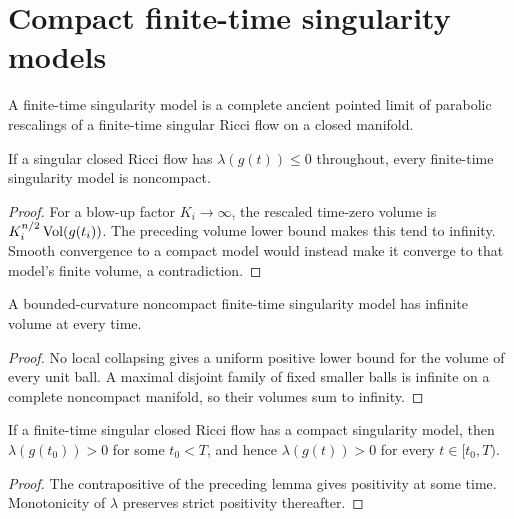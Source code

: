\section{Compact finite-time singularity models}

\begin{remark}
\label{rem:chow-iii-ch17-singularity-models}
A finite-time singularity model is a complete ancient pointed limit of
parabolic rescalings of a finite-time singular Ricci flow on a closed
manifold.
\end{remark}

\begin{lemma}
\label{lem:chow-iii-ch17-model-noncompact-nonpositive-lambda}
If a singular closed Ricci flow has $\lambda(g(t))\le0$ throughout, every
finite-time singularity model is noncompact.
\end{lemma}
\begin{proof}
For a blow-up factor $K_i\to\infty$, the rescaled time-zero volume is
$K_i^{n/2}\operatorname{Vol}(g(t_i))$.  The preceding volume lower bound makes this tend
to infinity.  Smooth convergence to a compact model would instead make it
converge to that model's finite volume, a contradiction.
\end{proof}

\begin{remark}
\label{rem:chow-iii-ch17-noncompact-model-infinite-volume}
A bounded-curvature noncompact finite-time singularity model has infinite
volume at every time.
\end{remark}
\begin{proof}
No local collapsing gives a uniform positive lower bound for the volume of
every unit ball.  A maximal disjoint family of fixed smaller balls is
infinite on a complete noncompact manifold, so their volumes sum to infinity.
\end{proof}

\begin{corollary}
\label{cor:chow-iii-ch17-compact-model-positive-lambda}
If a finite-time singular closed Ricci flow has a compact singularity model,
then $\lambda(g(t_0))>0$ for some $t_0<T$, and hence
$\lambda(g(t))>0$ for every $t\in[t_0,T)$.
\end{corollary}
\begin{proof}
The contrapositive of the preceding lemma gives positivity at some time.
Monotonicity of $\lambda$ preserves strict positivity thereafter.
\end{proof}

